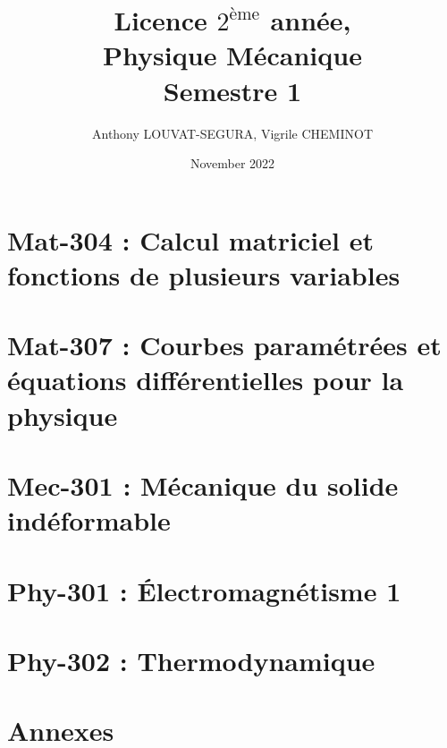 \documentclass[a4paper, 12pt, openright, twoside, french]{book}
\title{Licence $2^{\text{ème}}$ année,\\Physique Mécanique\\ Semestre 1}
\author{Anthony LOUVAT-SEGURA, Vigrile CHEMINOT}
\date{November 2022}
\begin{document}
\maketitle
\tableofcontents
\part{Mat-304 : Calcul matriciel et fonctions de plusieurs variables}

\newpage
\part{Mat-307 : Courbes paramétrées et équations différentielles pour la physique}

\part{Mec-301 : Mécanique du solide indéformable}

\part{Phy-301 : Électromagnétisme 1}

\part{Phy-302 : Thermodynamique}

\part{Annexes}

\end{document}
